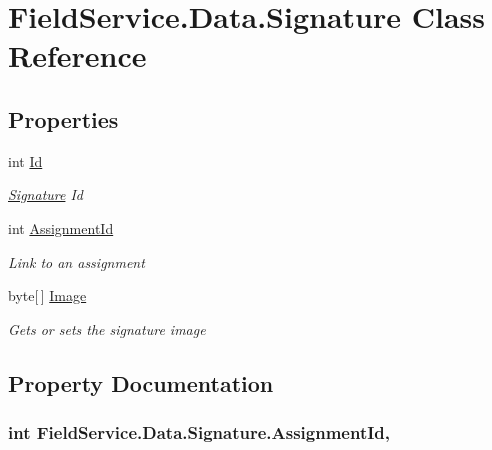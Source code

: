 \hypertarget{class_field_service_1_1_data_1_1_signature}{\section{Field\+Service.\+Data.\+Signature Class Reference}
\label{class_field_service_1_1_data_1_1_signature}
}
\subsection*{Properties}
\begin{DoxyCompactItemize}
\item 
int \hyperlink{class_field_service_1_1_data_1_1_signature_acf364eb6a7f3bfb6a48f83736b043379}{Id}
\begin{DoxyCompactList}\small\item\em \hyperlink{class_field_service_1_1_data_1_1_signature}{Signature} Id \end{DoxyCompactList}\item 
int \hyperlink{class_field_service_1_1_data_1_1_signature_ac38eeb93eb034dbde314302d3daff775}{Assignment\+Id}
\begin{DoxyCompactList}\small\item\em Link to an assignment \end{DoxyCompactList}\item 
byte\mbox{[}$\,$\mbox{]} \hyperlink{class_field_service_1_1_data_1_1_signature_a90ac769112963b2c2db9967394679cb8}{Image}
\begin{DoxyCompactList}\small\item\em Gets or sets the signature image \end{DoxyCompactList}\end{DoxyCompactItemize}


\subsection{Property Documentation}
\hypertarget{class_field_service_1_1_data_1_1_signature_ac38eeb93eb034dbde314302d3daff775}{
\subsubsection[{Assignment\+Id}]{\setlength{\rightskip}{0pt plus 5cm}int Field\+Service.\+Data.\+Signature.\+Assignment\+Id\hspace{0.3cm}{\ttfamily [get]}, {\ttfamily [set]}}}\label{class_field_service_1_1_data_1_1_signature_ac38eeb93eb034dbde314302d3daff775}


